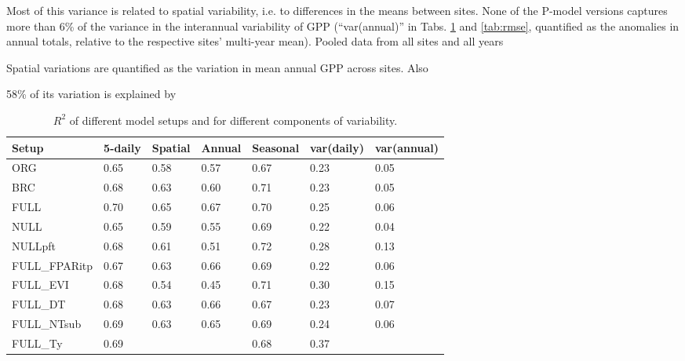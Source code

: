 \documentclass{myreport}
\begin{document}
Most of this variance is related to spatial variability, i.e. to differences in the means between sites. None of the P-model versions captures more than 6\% of the variance in the interannual variability  of GPP (``var(annual)'' in Tabs. \ref{tab:rsq} and \ref{tab:rmse}, quantified as the anomalies in annual totals, relative to the respective sites' multi-year mean).  
Pooled data from all sites and all years


Spatial variations are quantified as the variation in mean annual GPP across sites. Also 

58\% of its variation is explained by 



\begin{table}
\centering
\begin{tabular}{lllllll}
  \toprule
  Setup & 5-daily & Spatial & Annual & Seasonal & var(daily) & var(annual) \\ 
  \midrule
  ORG & 0.65 & 0.58 & 0.57 & 0.67 & 0.23 & 0.05 \\ 
  BRC & 0.68 & 0.63 & 0.60 & 0.71 & 0.23 & 0.05 \\ 
  FULL & 0.70 & 0.65 & 0.67 & 0.70 & 0.25 & 0.06 \\ 
  NULL & 0.65 & 0.59 & 0.55 & 0.69 & 0.22 & 0.04 \\ 
  NULLpft & 0.68 & 0.61 & 0.51 & 0.72 & 0.28 & 0.13 \\ 
  \midrule
  FULL\_FPARitp & 0.67 & 0.63 & 0.66 & 0.69 & 0.22 & 0.06 \\ 
  FULL\_EVI & 0.68 & 0.54 & 0.45 & 0.71 & 0.30 & 0.15 \\ 
  \midrule
  FULL\_DT & 0.68 & 0.63 & 0.66 & 0.67 & 0.23 & 0.07 \\ 
  FULL\_NTsub & 0.69 & 0.63 & 0.65 & 0.69 & 0.24 & 0.06 \\ 
  FULL\_Ty & 0.69 &  &  & 0.68 & 0.37 &  \\ 
  \bottomrule
  \end{tabular}
\caption{$R^2$ of different model setups and for different components of variability.} 
\label{tab:rsq}
\end{table}
\end{document}
